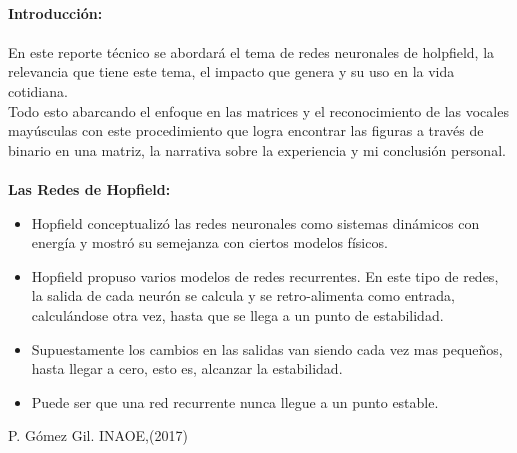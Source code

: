 \documentclass{article}
\begin{document}
\maketitle
\textsf{\ \\
\textbf{Introducción:}\\
\\
En este reporte técnico se abordará el tema de redes neuronales de holpfield, la relevancia que tiene este tema, el impacto que genera y su uso en la vida cotidiana.
\\
Todo esto abarcando el enfoque en las matrices y el reconocimiento de las vocales mayúsculas con este procedimiento que logra encontrar las figuras a través de binario en una matriz, la narrativa sobre la experiencia y mi conclusión personal. \\}
\\
\textbf{Las Redes de Hopfield:}
\begin{itemize}
    \item Hopfield conceptualizó las redes neuronales como
        sistemas dinámicos con energía y mostró su
        semejanza con ciertos modelos físicos.

    \item Hopfield propuso varios modelos de redes
recurrentes. En este tipo de redes, la salida de cada
neurón se calcula y se retro-alimenta como entrada,
calculándose otra vez, hasta que se llega a un punto
de estabilidad. 
    \item Supuestamente los cambios en las salidas van
siendo cada vez mas pequeños, hasta llegar a cero,
esto es, alcanzar la estabilidad.
    \item Puede ser que una red recurrente nunca llegue a un
punto estable.   
\end{itemize}
\textsf{P. Gómez Gil. INAOE,(2017)}
\\
\end{document}
